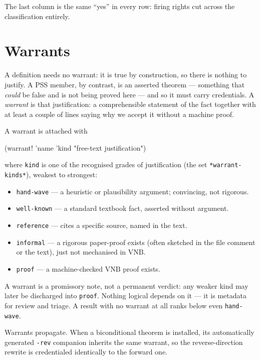 \noindent
The last column is the same ``yes'' in every row: firing rights cut across
the classification entirely.

\section{Warrants}
\label{sec:warrants}

A definition needs no warrant: it is true by construction, so there is
nothing to justify.  A PSS member, by contrast, is an asserted theorem ---
something that \emph{could} be false and is not being proved here --- and
so it must carry credentials.  A \emph{warrant} is that justification: a
comprehensible statement of the fact together with at least a couple of
lines saying why we accept it without a machine proof.

A warrant is attached with

\begin{VNBsnip}
(warrant! 'name 'kind "free-text justification")
\end{VNBsnip}

\noindent
where \texttt{kind} is one of the recognised grades of justification (the
set \texttt{*warrant-kinds*}), weakest to strongest:

\begin{itemize}
\item \texttt{hand-wave} --- a heuristic or plausibility argument;
  convincing, not rigorous.
\item \texttt{well-known} --- a standard textbook fact, asserted without
  argument.
\item \texttt{reference} --- cites a specific source, named in the text.
\item \texttt{informal} --- a rigorous paper-proof exists (often sketched
  in the file comment or the text), just not mechanised in VNB.
\item \texttt{proof} --- a machine-checked VNB proof exists.
\end{itemize}

\begin{remark}
A warrant is a promissory note, not a permanent verdict: any weaker kind
may later be discharged into \texttt{proof}.  Nothing logical depends on
it --- it is metadata for review and triage.  A result with no warrant at
all ranks below even \texttt{hand-wave}.
\end{remark}

\begin{remark}
Warrants propagate.  When a biconditional theorem is installed, its
automatically generated \texttt{-rev} companion inherits the same warrant,
so the reverse-direction rewrite is credentialed identically to the
forward one.
\end{remark}

